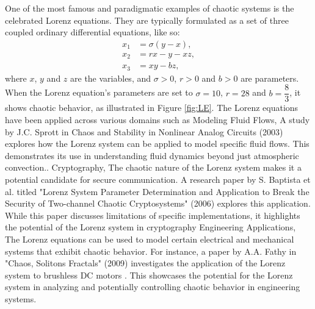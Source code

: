 \documentclass[11pt]{article}
\theoremstyle{definition}
\begin{document}
One of the most famous and paradigmatic examples of chaotic systems is the celebrated Lorenz equations. They are typically formulated as a set of three coupled ordinary differential equations, like so:
\begin{align*}
{x_1} &= \sigma(y - x), \\
{x_2} &= rx - y - xz, \\
{x_3} &= xy - bz,
\end{align*}
where $x$, $y$ and $z$ are the variables, and $\sigma > 0$, $r > 0$ and $b > 0$ are parameters. \\
When the Lorenz equation's parameters are set to $\sigma = 10$, $r = 28$ and $b = \dfrac{8}{3}$, it shows chaotic behavior, as illustrated in Figure \ref{fig:LE}. The Lorenz equations \cite{noauthor_lorenz_nodate} have been applied across various domains such as Modeling Fluid Flows,  A study by J.C. Sprott in Chaos and Stability in Nonlinear Analog Circuits (2003) \cite{bond_compact_2010} explores how the Lorenz system can be applied to model specific fluid flows. This demonstrates its use in understanding fluid dynamics beyond just atmospheric convection.\cite{elhadj_models_2011}.
Cryptography, The chaotic nature of the Lorenz system makes it a potential candidate for secure communication. A research paper by S. Baptista et al. titled "Lorenz System Parameter Determination and Application to Break the Security of Two-channel Chaotic Cryptosystems" (2006) explores this application. While this paper discusses limitations of specific implementations, it highlights the potential of the Lorenz system in cryptography \cite{orue_lorenz_2006}
Engineering Applications, The Lorenz equations can be used to model certain electrical and mechanical systems that exhibit chaotic behavior. For instance, a paper by A.A. Fathy in "Chaos, Solitons  Fractals" (2009) investigates the application of the Lorenz system to brushless DC motors \cite{qi_energy_2017}. This showcases the potential for the Lorenz system in analyzing and potentially controlling chaotic behavior in engineering systems.
\end{document}
